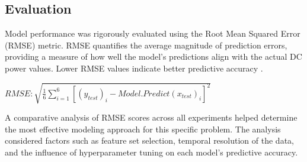 \subsection{Evaluation}

Model performance was rigorously evaluated using the Root Mean Squared Error (RMSE) metric. RMSE quantifies the average magnitude of prediction errors, providing a measure of how well the model's predictions align with the actual DC power values. Lower RMSE values indicate better predictive accuracy \citep{3f9716f9-d734-3af0-8b8b-7b1fe78e6a75}.

$RMSE: \sqrt{\frac{1}{6}\sum_{i=1}^{6} \left[ (y_{test})_i - Model.Predict(x_{test})_i \right]^2}$

A comparative analysis of RMSE scores across all experiments helped determine the most effective modeling approach for this specific problem. The analysis considered factors such as feature set selection, temporal resolution of the data, and the influence of hyperparameter tuning on each model's predictive accuracy.